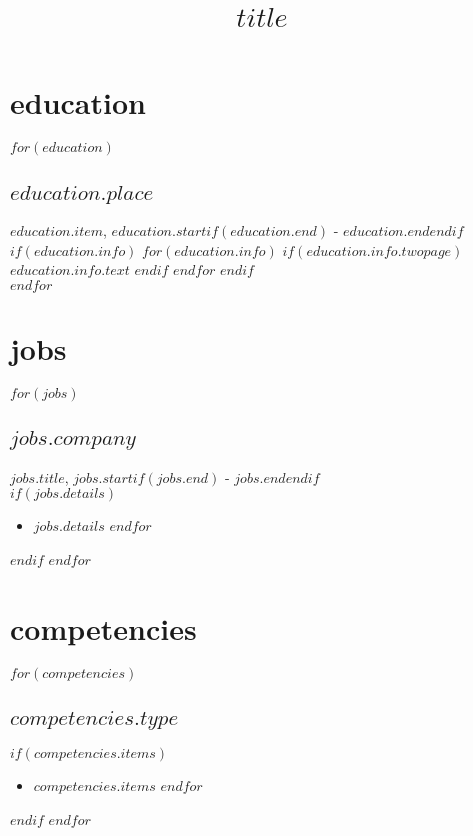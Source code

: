 \documentclass[11pt, A4]{article}
\title{$title$}
\begin{document}
\maketitle

\section{education}
$for(education)$
\subsection{$education.place$}
$education.item$, $education.start$$if(education.end)$ - $education.end$$endif$
$if(education.info)$ $for(education.info)$ $if(education.info.twopage)$ $education.info.text$ $endif$ $endfor$ $endif$ \\[.25cm]
$endfor$

\section{jobs}
$for(jobs)$
\subsection{$jobs.company$}
$jobs.title$,
$jobs.start$$if(jobs.end)$ - $jobs.end$$endif$\\[.25cm]
$if(jobs.details)$
\begin{itemize}
$for(jobs.details)$
\item $jobs.details$
$endfor$
\end{itemize}
$endif$
$endfor$

\section{competencies}
$for(competencies)$
\subsection{$competencies.type$}
$if(competencies.items)$
\begin{itemize}
$for(competencies.items)$
\item $competencies.items$
$endfor$
\end{itemize}
$endif$
$endfor$
\end{document}

